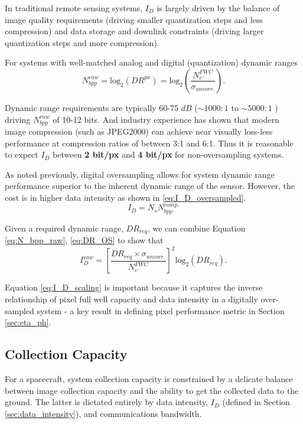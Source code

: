 \documentclass[]{spieman}  %
\begin{document}
In traditional remote sensing systems, $I_D$ is largely driven by the balance of image quality requirements (driving smaller quantization steps and less compression) and data storage and downlink constraints (driving larger quantization steps and more compression).

For systems with well-matched analog and digital (quantization) dynamic ranges
\begin{equation}
	\label{eq:N_bpp_raw}
    N_{bpp}^{raw} = \textrm{log}_2(DR^{px}) = \textrm{log}_2\left(\frac{N_{e^-}^{FWC}}{\sigma_{uncorr.}}\right).
\end{equation}

Dynamic range requirements are typically 60-75 $dB$ ($\sim 1000:1$ to $\sim 5000:1$ ) driving $N_{bpp}^{raw}$ of 10-12 bits.  And industry experience has shown that modern image compression (such as JPEG2000) can achieve near visually loss-less performance at compression ratios of between 3:1 and 6:1.  Thus it is reasonable to expect $I_D$ between \textbf{2 bit/px} and \textbf{4 bit/px} for non-oversampling systems.

As noted previously, digital oversampling allows for system dynamic range performance superior to the inherent dynamic range of the sensor.  However, the cost is in higher data intensity as shown in \eqref{eq:I_D_oversampled}.  
\begin{equation}
	\label{eq:I_D_oversampled}
    I_D = N_s N_{bpp}^{comp.} 
\end{equation}

Given a required dynamic range, $DR_{req}$, we can combine Equation \eqref{eq:N_bpp_raw}, \eqref{eq:DR_OS} to show that
\begin{equation}
    \label{eq:I_D_scaling}
    I_D^{raw} = \left[\frac{DR_{req}\times \sigma_{uncorr.}}{N_{e^-}^{FWC}}\right]^2 \textrm{log}_2 (DR_{req}).
\end{equation}

Equation \eqref{eq:I_D_scaling} is important because it captures the inverse relationship of pixel full well capacity and data intensity in a digitally over-sampled system - a key result in defining pixel performance metric in Section \ref{sec:eta_ph}.

\subsection{Collection Capacity}
\label{sec:capacity}
For a spacecraft, system collection capacity is constrained by a delicate balance between image collection capacity and the ability to get the collected data to the ground.  The latter is dictated entirely by data intensity, $I_D$ (defined in Section \ref{sec:data_intensity}), and communications bandwidth.  
\end{document}
